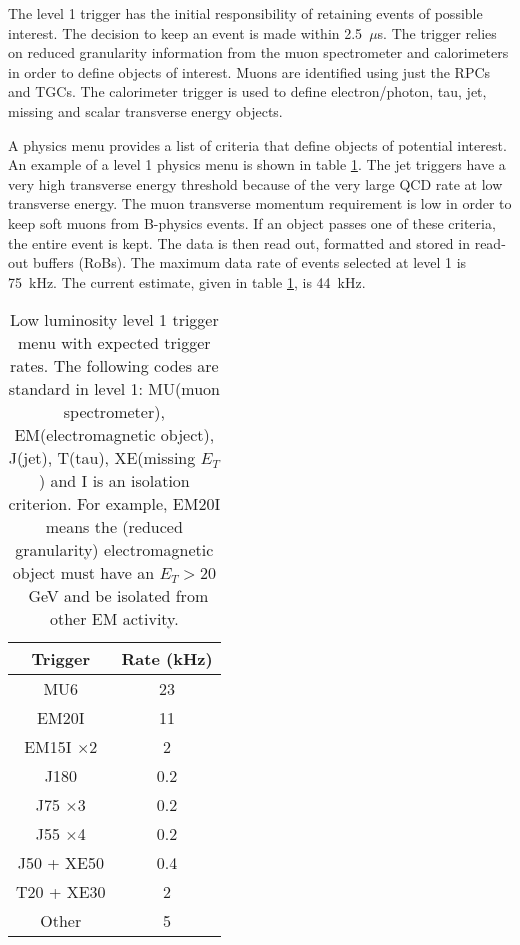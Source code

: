 The level 1 trigger has the initial responsibility of retaining events of possible interest. The decision to keep an event is made within 2.5~$\mu$s. The trigger relies on reduced granularity information from the muon spectrometer and calorimeters in order to define objects of interest. Muons are identified using just the RPCs and TGCs. The calorimeter trigger is used to define electron/photon, tau, jet, missing and scalar transverse energy objects. 

A physics menu provides a list of criteria that define objects of potential interest. An example of a level 1 physics menu is shown in table \ref{menulvl1}. The jet triggers have a very high transverse energy threshold because of the very large QCD rate at low transverse energy. The muon transverse momentum requirement is low in order to keep soft muons from B-physics events. If an object passes one of these criteria, the entire event is kept. The data is then read out, formatted and stored in read-out buffers (RoBs).
The maximum data rate of events selected at level 1 is 75~kHz. The current estimate, given in table \ref{menulvl1}, is 44~kHz.

\begin{table}[t]
\centering
\begin{tabular}{|c|c|}
\hline
Trigger & Rate (kHz) \\
\hline
MU6 & 23\\
EM20I& 11\\
EM15I $\times2$& 2\\
J180 & 0.2\\
J75 $\times$3 & 0.2\\
J55 $\times$4 & 0.2\\
J50 + XE50& 0.4\\
T20 + XE30 & 2\\
Other & 5\\ 
\hline
\end{tabular}
\caption[ATLAS low luminosity level 1 trigger menu]{Low luminosity level 1 trigger menu \cite{:1999fq:Chapter11} with expected trigger rates. The following codes are standard in level 1: MU(muon spectrometer), EM(electromagnetic object), J(jet), T(tau), XE(missing $E_T$) and I is an isolation criterion. For example, EM20I means the (reduced granularity) electromagnetic object must have an $E_T > 20$~GeV and be isolated from other EM activity.\label{menulvl1}}
\end{table}%

